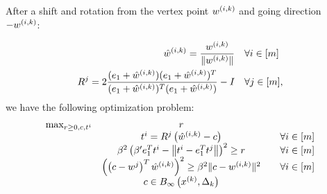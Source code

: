 After a shift and rotation from the vertex point ${w^{(i, k)}}$ and going direction $-{w^{(i, k)}}$:

\begin{align*}
\hat w^{(i,k)} = \frac {{w^{(i, k)}}} {\|{w^{(i, k)}}\|} & \quad \forall i \in [m] \\
R^j = 2 \frac{(e_1 + \hat w^{(i,k)})(e_1 + \hat w^{(i,k)})^T}{(e_1 + \hat w^{(i,k)})^T(e_1 + \hat w^{(i,k)})} - I  & \quad \forall j \in [m],
\end{align*}
we have the following optimization problem:
\begin{align*}
\begin{array} {ccc}
\max_{r \ge 0, c, t^i}	& r & \\
					& t^i = R^j\left(\hat w^{(i,k)} - c\right) 									& \quad \forall i \in [m] \\
					& \beta^2 \left(\beta' e_1^T t^i - \left\|t^i - e_1^T t^j\right\|\right)^2 \ge r			& \quad \forall i \in [m] \\
					& \left(\left(c - w^j\right)^T\hat w^{(i,k)}\right)^2 \ge \beta^2 \|c - {w^{(i, k)}}\|^2		& \quad \forall i \in [m] \\
					& c \in { B_{\infty}\left(x^{(k)}, \Delta_k\right) } &
\end{array}
\end{align*}

% 
% 
% 
% 
% 
% 
% 

